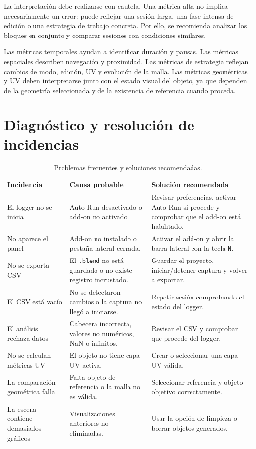 La interpretación debe realizarse con cautela. Una métrica alta no implica necesariamente un error: puede reflejar una sesión larga, una fase intensa de edición o una estrategia de trabajo concreta. Por ello, se recomienda analizar los bloques en conjunto y comparar sesiones con condiciones similares.

Las métricas temporales ayudan a identificar duración y pausas. Las métricas espaciales describen navegación y proximidad. Las métricas de estrategia reflejan cambios de modo, edición, UV y evolución de la malla. Las métricas geométricas y UV deben interpretarse junto con el estado visual del objeto, ya que dependen de la geometría seleccionada y de la existencia de referencia cuando proceda.

\section{Diagnóstico y resolución de incidencias}
\label{sec:e-diagnostico}

\begin{table}[H]
\centering
\scriptsize
\renewcommand{\arraystretch}{1.15}
\begin{tabularx}{\textwidth}{p{4cm}X X}
\toprule
\textbf{Incidencia} & \textbf{Causa probable} & \textbf{Solución recomendada} \\
\midrule
El logger no se inicia & Auto Run desactivado o add-on no activado. & Revisar preferencias, activar Auto Run si procede y comprobar que el add-on está habilitado. \\
No aparece el panel & Add-on no instalado o pestaña lateral cerrada. & Activar el add-on y abrir la barra lateral con la tecla \texttt{N}. \\
No se exporta CSV & El \texttt{.blend} no está guardado o no existe registro incrustado. & Guardar el proyecto, iniciar/detener captura y volver a exportar. \\
El CSV está vacío & No se detectaron cambios o la captura no llegó a iniciarse. & Repetir sesión comprobando el estado del logger. \\
El análisis rechaza datos & Cabecera incorrecta, valores no numéricos, NaN o infinitos. & Revisar el CSV y comprobar que procede del logger. \\
No se calculan métricas UV & El objeto no tiene capa UV activa. & Crear o seleccionar una capa UV válida. \\
La comparación geométrica falla & Falta objeto de referencia o la malla no es válida. & Seleccionar referencia y objeto objetivo correctamente. \\
La escena contiene demasiados gráficos & Visualizaciones anteriores no eliminadas. & Usar la opción de limpieza o borrar objetos generados. \\
\bottomrule
\end{tabularx}
\caption{Problemas frecuentes y soluciones recomendadas.}
\label{tab:e-incidencias}
\end{table}

